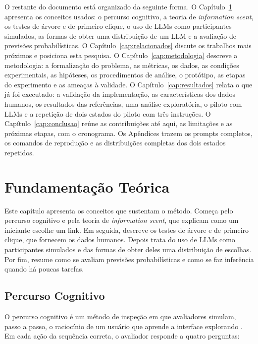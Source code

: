 \documentclass[12pt,oneside,a4paper,chapter=TITLE,english,brazil]{abntex2}
\begin{document}
O restante do documento está organizado da seguinte forma. O Capítulo~\ref{cap:fundamentacao} apresenta os conceitos usados: o percurso cognitivo, a teoria de \textit{information scent}, os testes de árvore e de primeiro clique, o uso de LLMs como participantes simulados, as formas de obter uma distribuição de um LLM e a avaliação de previsões probabilísticas. O Capítulo~\ref{cap:relacionados} discute os trabalhos mais próximos e posiciona esta pesquisa. O Capítulo~\ref{cap:metodologia} descreve a metodologia: a formalização do problema, as métricas, os dados, as condições experimentais, as hipóteses, os procedimentos de análise, o protótipo, as etapas do experimento e as ameaças à validade. O Capítulo~\ref{cap:resultados} relata o que já foi executado: a validação da implementação, as características dos dados humanos, os resultados das referências, uma análise exploratória, o piloto com LLMs e a repetição de dois estados do piloto com três instruções. O Capítulo~\ref{cap:conclusao} reúne as contribuições até aqui, as limitações e as próximas etapas, com o cronograma. Os Apêndices trazem os prompts completos, os comandos de reprodução e as distribuições completas dos dois estados repetidos.

\chapter{Fundamentação Teórica}
\label{cap:fundamentacao}

Este capítulo apresenta os conceitos que sustentam o método. Começa pelo percurso cognitivo e pela teoria de \textit{information scent}, que explicam como um iniciante escolhe um link. Em seguida, descreve os testes de árvore e de primeiro clique, que fornecem os dados humanos. Depois trata do uso de LLMs como participantes simulados e das formas de obter deles uma distribuição de escolhas. Por fim, resume como se avaliam previsões probabilísticas e como se faz inferência quando há poucas tarefas.

\section{Percurso Cognitivo}
\label{sec:cw}

O percurso cognitivo é um método de inspeção em que avaliadores simulam, passo a passo, o raciocínio de um usuário que aprende a interface explorando \cite{polson1992cw,wharton1994cw}. Em cada ação da sequência correta, o avaliador responde a quatro perguntas:
\end{document}
